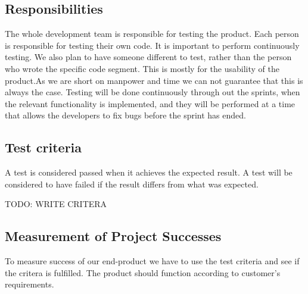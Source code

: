 \subsection{Responsibilities}
The whole development team is responsible for testing the product. 
Each person is responsible for testing their own code. It is important to perform continuously testing. We also plan to have someone different to test, rather than the person who wrote the specific code segment. 
This is mostly for the usability of the product.As we are short on manpower and time we can not guarantee that this is always the case.
Testing will be done continuously through out the sprints, when the relevant functionality is implemented, and they will be performed at a time that allows the developers to fix bugs before the sprint has ended. 

\subsection{Test criteria} 
A test is considered passed when it achieves the expected result.
A test will be considered to have failed if the result differs from what was expected.

TODO: WRITE CRITERA

\subsection{Measurement of Project Successes}
To measure success of our end-product we have to use the test criteria and see if the critera is fulfilled. The product should function according to customer's requirements.

